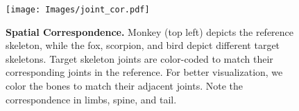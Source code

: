 \begin{figure}
    

    \centering
    
    \texttt{[image: Images/joint\_cor.pdf]}
    
    \caption{
        \textbf{Spatial Correspondence.} Monkey (top left) depicts the reference skeleton, while the fox, scorpion, and bird depict different target skeletons. 
        Target skeleton joints are color-coded to match their corresponding joints in the reference. 
        For better visualization, we color the bones to match their adjacent joints. 
        Note the correspondence in limbs, spine, and tail.
       }
    \label{fig:spatial_cor}
    \Description[]{}  %
\end{figure}
